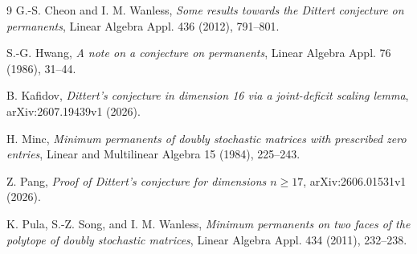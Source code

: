 \documentclass[11pt]{article}
\theoremstyle{remark}
\begin{document}
\begin{thebibliography}{9}
G.-S. Cheon and I. M. Wanless,
\emph{Some results towards the Dittert conjecture on permanents},
Linear Algebra Appl. 436 (2012), 791--801.

S.-G. Hwang,
\emph{A note on a conjecture on permanents},
Linear Algebra Appl. 76 (1986), 31--44.

B. Kafidov,
\emph{Dittert's conjecture in dimension 16 via a joint-deficit scaling lemma},
arXiv:2607.19439v1 (2026).

H. Minc,
\emph{Minimum permanents of doubly stochastic matrices with prescribed zero
entries},
Linear and Multilinear Algebra 15 (1984), 225--243.

Z. Pang,
\emph{Proof of Dittert's conjecture for dimensions $n\ge17$},
arXiv:2606.01531v1 (2026).

K. Pula, S.-Z. Song, and I. M. Wanless,
\emph{Minimum permanents on two faces of the polytope of doubly stochastic matrices},
Linear Algebra Appl. 434 (2011), 232--238.
\end{thebibliography}
\end{document}
